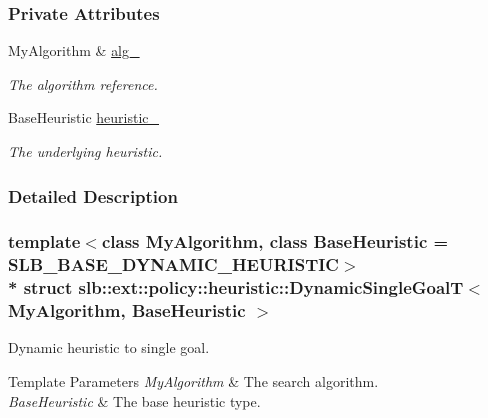 \subsubsection*{Private Attributes}
\begin{DoxyCompactItemize}
\item 
My\+Algorithm \& \hyperlink{structslb_1_1ext_1_1policy_1_1heuristic_1_1DynamicSingleGoalT_a026cda2674bdc44e0ccef60f63faa92f}{alg\+\_\+}\hypertarget{structslb_1_1ext_1_1policy_1_1heuristic_1_1DynamicSingleGoalT_a026cda2674bdc44e0ccef60f63faa92f}{}\label{structslb_1_1ext_1_1policy_1_1heuristic_1_1DynamicSingleGoalT_a026cda2674bdc44e0ccef60f63faa92f}

\begin{DoxyCompactList}\small\item\em The algorithm reference. \end{DoxyCompactList}\item 
Base\+Heuristic \hyperlink{structslb_1_1ext_1_1policy_1_1heuristic_1_1DynamicSingleGoalT_ae024f3749f1b97023f767267a07955f5}{heuristic\+\_\+}\hypertarget{structslb_1_1ext_1_1policy_1_1heuristic_1_1DynamicSingleGoalT_ae024f3749f1b97023f767267a07955f5}{}\label{structslb_1_1ext_1_1policy_1_1heuristic_1_1DynamicSingleGoalT_ae024f3749f1b97023f767267a07955f5}

\begin{DoxyCompactList}\small\item\em The underlying heuristic. \end{DoxyCompactList}\end{DoxyCompactItemize}


\subsubsection{Detailed Description}
\subsubsection*{template$<$class My\+Algorithm, class Base\+Heuristic = S\+L\+B\+\_\+\+B\+A\+S\+E\+\_\+\+D\+Y\+N\+A\+M\+I\+C\+\_\+\+H\+E\+U\+R\+I\+S\+T\+IC$>$\\*
struct slb\+::ext\+::policy\+::heuristic\+::\+Dynamic\+Single\+Goal\+T$<$ My\+Algorithm, Base\+Heuristic $>$}

Dynamic heuristic to single goal. 


\begin{DoxyTemplParams}{Template Parameters}
{\em My\+Algorithm} & The search algorithm. \\
\hline
{\em Base\+Heuristic} & The base heuristic type. \\
\hline
\end{DoxyTemplParams}


